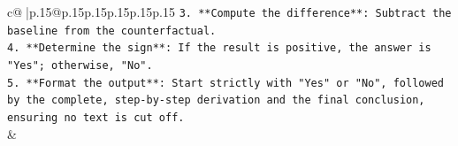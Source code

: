 \documentclass{article}
\begin{document}
{\begin{supertabular}{c@{$\;$}|p{.15\linewidth}@{}p{.15\linewidth}p{.15\linewidth}p{.15\linewidth}p{.15\linewidth}p{.15\linewidth}}
{{{\texttt{3.  **Compute the difference**: Subtract the baseline from the counterfactual.} \\
\texttt{4.  **Determine the sign**: If the result is positive, the answer is "Yes"; otherwise, "No".} \\
\texttt{5.  **Format the output**: Start strictly with "Yes" or "No", followed by the complete, step{-}by{-}step derivation and the final conclusion, ensuring no text is cut off.} \\
            }
        }
    }
    & \\ \\

\end{supertabular}
}
\end{document}
